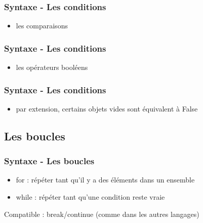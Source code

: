 \begin{frame}[fragile]
  \frametitle{Syntaxe - Les conditions}
  \begin{itemize}
    \item les comparaisons
  \end{itemize}
  \begin{ipython}
  \end{ipython}
\end{frame}

\begin{frame}[fragile]
  \frametitle{Syntaxe - Les conditions}
  \begin{itemize}
    \item les opérateurs booléens
  \end{itemize}
  \begin{ipython}
  \end{ipython}
\end{frame}

\begin{frame}[fragile]
  \frametitle{Syntaxe - Les conditions}
  \begin{itemize}
    \item par extension, certains objets vides sont équivalent à False
  \end{itemize}
  \begin{ipython}
  \end{ipython}
\end{frame}

\subsection{Les boucles}
\begin{frame}[fragile]
  \frametitle{Syntaxe - Les boucles}
  \begin{itemize}
    \item for : répéter tant qu'il y a des éléments dans un ensemble
    \item while : répéter tant qu'une condition reste vraie
  \end{itemize}

  Compatible : break/continue (comme dans les autres langages)
\end{frame}

